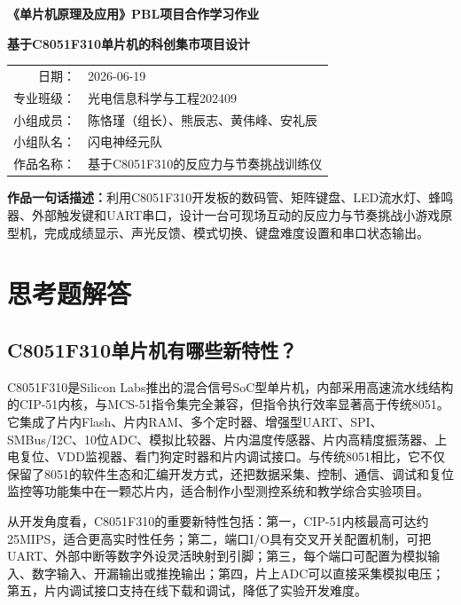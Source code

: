 ﻿\documentclass[UTF8,a4paper,12pt]{ctexart}
\begin{document}
\begin{center}
{\bfseries 《单片机原理及应用》PBL项目合作学习作业}\par
\vspace{0.4em}
{\bfseries 基于C8051F310单片机的科创集市项目设计}\par
\vspace{1.2em}
\begin{tabular}{rl}
日期： & 2026-06-19 \\
专业班级： & 光电信息科学与工程202409 \\
小组成员： & 陈恪瑾（组长）、熊辰志、黄伟峰、安礼辰 \\
小组队名： & 闪电神经元队 \\
作品名称： & 基于C8051F310的反应力与节奏挑战训练仪 \\
\end{tabular}
\end{center}

\vspace{1em}
\noindent\textbf{作品一句话描述：}利用C8051F310开发板的数码管、矩阵键盘、LED流水灯、蜂鸣器、外部触发键和UART串口，设计一台可现场互动的反应力与节奏挑战小游戏原型机，完成成绩显示、声光反馈、模式切换、键盘难度设置和串口状态输出。

\section{思考题解答}

\subsection{C8051F310单片机有哪些新特性？}
C8051F310是Silicon Labs推出的混合信号SoC型单片机，内部采用高速流水线结构的CIP-51内核，与MCS-51指令集完全兼容，但指令执行效率显著高于传统8051。它集成了片内Flash、片内RAM、多个定时器、增强型UART、SPI、SMBus/I2C、10位ADC、模拟比较器、片内温度传感器、片内高精度振荡器、上电复位、VDD监视器、看门狗定时器和片内调试接口。与传统8051相比，它不仅保留了8051的软件生态和汇编开发方式，还把数据采集、控制、通信、调试和复位监控等功能集中在一颗芯片内，适合制作小型测控系统和教学综合实验项目。

从开发角度看，C8051F310的重要新特性包括：第一，CIP-51内核最高可达约25MIPS，适合更高实时性任务；第二，端口I/O具有交叉开关配置机制，可把UART、外部中断等数字外设灵活映射到引脚；第三，每个端口可配置为模拟输入、数字输入、开漏输出或推挽输出；第四，片上ADC可以直接采集模拟电压；第五，片内调试接口支持在线下载和调试，降低了实验开发难度。
\end{document}
